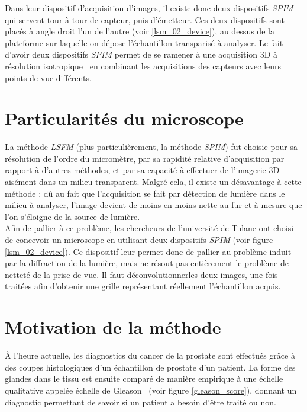 \documentclass[utf8]{stageM2R}
\begin{document}
{{			Dans leur dispositif d'acquisition d'images, il existe donc deux dispositifs \textit{SPIM} qui servent tour à tour de capteur, puis d'émetteur. Ces deux dispositifs sont placés à angle droit l'un de l'autre (voir \ref{lsm_02_device}), au dessus de la plateforme sur laquelle on dépose l'échantillon transparisé à analyser. Le fait d'avoir deux dispositifs \textit{SPIM} permet de se ramener à une acquisition 3D à résolution isotropique\footnotemark~ en combinant les acquisitions des capteurs avec leurs points de vue différents.\\
		}
		\section{Particularités du microscope}\label{section:02_02_microscope}
		{
			La méthode \textit{LSFM} (plus particulièrement, la méthode \textit{SPIM}) fut choisie pour sa résolution de l'ordre du micromètre, par sa rapidité relative d'acquisition par rapport à d'autres méthodes, et par sa capacité à effectuer de l'imagerie 3D aisément dans un milieu transparent. Malgré cela, il existe un désavantage à cette méthode : dû au fait que l'acquisition se fait par détection de lumière dans le milieu à analyser, l'image devient de moins en moins nette au fur et à mesure que l'on s'éloigne de la source de lumière.\\
			Afin de pallier à ce problème, les chercheurs de l'université de Tulane ont choisi de concevoir un microscope en utilisant deux dispositifs \textit{SPIM} (voir figure \ref{lsm_02_device}). Ce dispositif leur permet donc de pallier au problème induit par la diffraction de la lumière, mais ne résout pas entièrement le problème de netteté de la prise de vue. Il faut déconvolutionner\footnotemark les deux images, une fois traitées afin d'obtenir une grille représentant réellement l'échantillon acquis.
		}
		\section{Motivation de la méthode}\label{section:02_03_motivation}
		{
			À l'heure actuelle, les diagnostics du cancer de la prostate sont effectués grâce à des coupes histologiques d'un échantillon de prostate d'un patient. La forme des glandes dans le tissu est ensuite comparé de manière empirique à une échelle qualitative appelée échelle de Gleason~\cite{cite_gleason_score} (voir figure \ref{gleason_score}), donnant un diagnostic permettant de savoir si un patient a besoin d'être traité ou non.\\

}}
\end{document}
